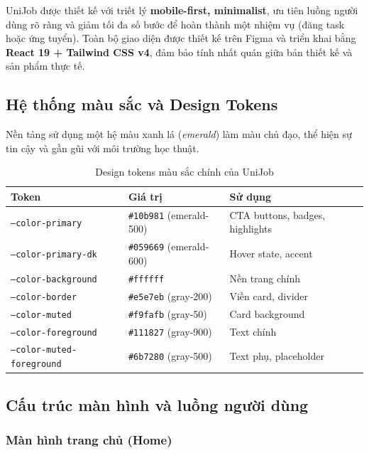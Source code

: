 UniJob được thiết kế với triết lý \textbf{mobile-first, minimalist}, ưu tiên luồng người
dùng rõ ràng và giảm tối đa số bước để hoàn thành một nhiệm vụ (đăng task hoặc ứng tuyển).
Toàn bộ giao diện được thiết kế trên Figma và triển khai bằng
\textbf{React 19 + Tailwind CSS v4}, đảm bảo tính nhất quán giữa bản thiết kế và sản phẩm
thực tế.

\subsection{Hệ thống màu sắc và Design Tokens}

Nền tảng sử dụng một hệ màu xanh lá (\textit{emerald}) làm màu chủ đạo, thể hiện sự tin cậy
và gần gũi với môi trường học thuật.

\begin{table}[H]
\centering
\caption{Design tokens màu sắc chính của UniJob}
\renewcommand{\arraystretch}{1.2}
\begin{tabularx}{\textwidth}{|p{5.2cm}|p{3.3cm}|X|}
\hline
\textbf{Token} & \textbf{Giá trị} & \textbf{Sử dụng} \\
\hline
\texttt{--color-primary}     & \texttt{\#10b981} (emerald-500) & CTA buttons, badges, highlights \\
\hline
\texttt{--color-primary-dk}  & \texttt{\#059669} (emerald-600) & Hover state, accent \\
\hline
\texttt{--color-background}  & \texttt{\#ffffff}               & Nền trang chính \\
\hline
\texttt{--color-border}      & \texttt{\#e5e7eb} (gray-200)    & Viền card, divider \\
\hline
\texttt{--color-muted}       & \texttt{\#f9fafb} (gray-50)     & Card background \\
\hline
\texttt{--color-foreground}  & \texttt{\#111827} (gray-900)    & Text chính \\
\hline
\texttt{--color-muted-foreground} & \texttt{\#6b7280} (gray-500) & Text phụ, placeholder \\
\hline
\end{tabularx}
\end{table}

\subsection{Cấu trúc màn hình và luồng người dùng}

\subsubsection{Màn hình trang chủ (Home)}

